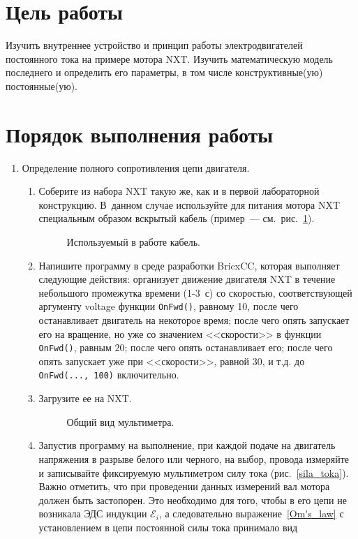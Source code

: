 \documentclass[12pt, a4paper, openany]{extarticle}
\begin{document}
\newpage
\section{Цель работы}
\hspace*{\parindent}Изучить внутреннее устройство и принцип работы электродвигателей постоянного тока на примере мотора NXT.
Изучить математическую модель последнего и определить его параметры, в том числе конструктивные(ую) постоянные(ую).
\section{Порядок выполнения работы}
\begin{enumerate}			
\item Определение полного сопротивления цепи двигателя.
\begin{enumerate}
\item Соберите из набора NXT такую же, как и в первой лабораторной конструкцию. В~данном случае используйте для питания мотора NXT специальным образом вскрытый кабель (пример~--- см.~рис.~\ref{wibe}).
\begin{figure}[h]
	\caption{Используемый в работе кабель.}
	\label{wibe}
\end{figure}
\item \label{prog}Напишите программу в среде разработки BricxCC, которая выполняет следующие действия: организует движение двигателя NXT в течение небольшого промежутка времени (1-3~с) со скоростью, соответствующей аргументу voltage функции \verb|OnFwd()|, равному 10, после чего останавливает двигатель на некоторое время; после чего опять запускает его на вращение, но уже со значением <<скорости>> в функции \verb|OnFwd()|, равным 20; после чего опять останавливает его; после чего опять запускает уже при <<скорости>>, равной 30, и т.д. до  \verb|OnFwd(..., 100)| включительно.
\item Загрузите ее на NXT.
\begin{figure}[h]
	\caption{Общий вид мультиметра.}
	\label{multimetr}
\end{figure} 
\item Запустив программу на выполнение, при каждой подаче на двигатель напряжения в разрыве белого или черного, на выбор, провода измеряйте и записывайте фиксируемую мультиметром силу тока (рис.~\ref{sila_toka}). Важно отметить, что при проведении данных измерений вал мотора должен быть застопорен. Это необходимо для того, чтобы в его цепи не возникала ЭДС индукции $\mathcal E_i$, а следовательно выражение~\eqref{Om's_law} с установлением в цепи постоянной силы тока принимало вид

\end{enumerate}
\end{enumerate}
\end{document}
